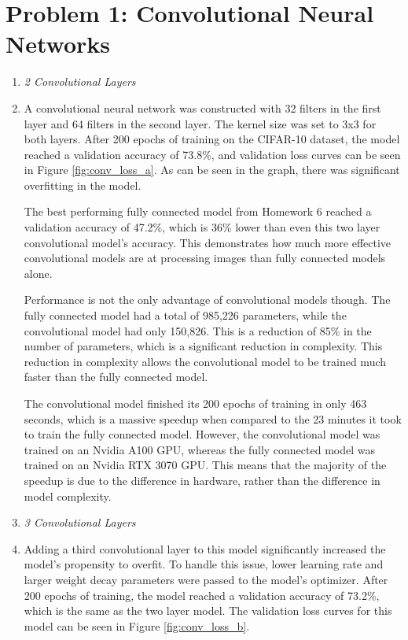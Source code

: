 \documentclass{article}
\begin{document}


\section{Problem 1: Convolutional Neural Networks}
\begin{enumerate}[label=\alph*. ]
    \item \textit{2 Convolutional Layers}
    \item
     A convolutional neural network was constructed with 32 filters in the first layer and 64 filters in the second layer. The kernel size was set to 3x3 for both layers. After 200 epochs of training on the CIFAR-10 dataset, the model reached a validation accuracy of 73.8\%, and validation loss curves can be seen in Figure \ref{fig:conv_loss_a}. As can be seen in the graph, there was significant overfitting in the model.
     
     The best performing fully connected model from Homework 6 reached a validation accuracy of 47.2\%, which is 36\% lower than even this two layer convolutional model's accuracy. This demonstrates how much more effective convolutional models are at processing images than fully connected models alone. 
     
     Performance is not the only advantage of convolutional models though. The fully connected model had a total of 985,226 parameters, while the convolutional model had only 150,826. This is a reduction of 85\% in the number of parameters, which is a significant reduction in complexity. This reduction in complexity allows the convolutional model to be trained much faster than the fully connected model. 
     
     The convolutional model finished its 200 epochs of training in only 463 seconds, which is a massive speedup when compared to the 23 minutes it took to train the fully connected model. However, the convolutional model was trained on an Nvidia A100 GPU, whereas the fully connected model was trained on an Nvidia RTX 3070 GPU. This means that the majority of the speedup is due to the difference in hardware, rather than the difference in model complexity.
     
     \item \textit{3 Convolutional Layers}
     \item 
     Adding a third convolutional layer to this model significantly increased the model's propensity to overfit. To handle this issue, lower learning rate and larger weight decay parameters were passed to the model's optimizer. After 200 epochs of training, the model reached a validation accuracy of 73.2\%, which is the same as the two layer model. The validation loss curves for this model can be seen in Figure \ref{fig:conv_loss_b}.


\end{enumerate}
\end{document}
